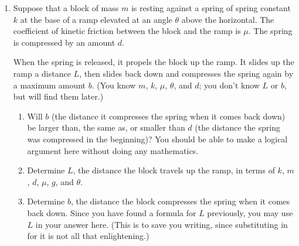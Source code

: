 \documentclass[12pt]{article}
\begin{document}
\begin{enumerate}
\begin{enumerate}
	
\end{enumerate}	

\newpage

\item Suppose that a block of mass $m$ is resting against a spring of spring constant $k$ at the base of a 
ramp elevated at an angle $\theta$ above the horizontal. The coefficient of kinetic friction between the block and the ramp is $\mu$. The spring is compressed by an amount $d$. 

When the spring is released, it propels the block up the ramp. It slides up the ramp a distance $L$,
then slides back down and compresses the spring again by a maximum amount $b$. (You know $m$, $k$, $\mu$, $\theta$, and $d$; you don't know $L$ or $b$, but will find them later.)

\begin{enumerate}
	\item Will $b$ (the distance it compresses the spring when it comes back down) be larger than, the same as, or smaller than $d$ (the distance the spring was compressed in the beginning)? You should be able to make a logical argument here without doing any mathematics.
	
	\item Determine $L$, the distance the block travels up the ramp, in terms of $k$, $m$, $d$, $\mu$, $g$, and $\theta$.
	
	\item Determine $b$, the distance the block compresses the spring when it comes back down. Since you have found a formula for $L$ previously, you may use $L$ in your answer here. (This is to save you writing, since substituting in for it is not all that enlightening.)
	
\end{enumerate}
\end{enumerate}





	
\end{document}
